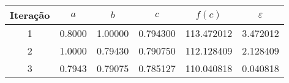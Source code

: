 \begin{tabular}{cccccc}
\toprule
Iteração &    $a$ &     $b$ &      $c$ &     $f(c)$ & $\varepsilon$ \\
\midrule
       1 & 0.8000 & 1.00000 & 0.794300 & 113.472012 &      3.472012 \\
       2 & 1.0000 & 0.79430 & 0.790750 & 112.128409 &      2.128409 \\
       3 & 0.7943 & 0.79075 & 0.785127 & 110.040818 &      0.040818 \\
\bottomrule
\end{tabular}
